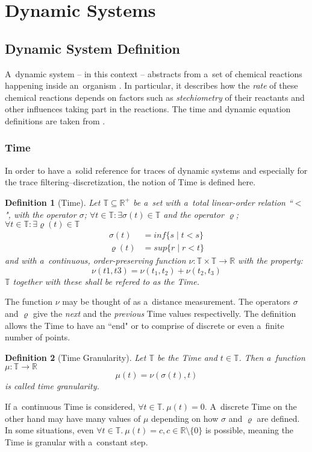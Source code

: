 \documentclass[12pt,oneside,draft]{fithesis}
\newcommand{\mReal}{\mathbb{R}}
\newcommand{\mTime}{\mathbb{T}}
\newtheorem{mydef}{Definition}
\begin{document}
\section{Dynamic Systems}
\subsection{Dynamic System Definition}
A~dynamic system -- in this context -- abstracts from
a~set of chemical reactions happening inside an~organism \cite{sven}.
In particular, it describes how the \emph{rate} of these chemical
reactions depends on factors such as \emph{stechiometry} of their
reactants and other influences taking part in the reactions.
The time and dynamic equation definitions are taken from
\cite{pospisil}.
\subsubsection{Time}
In order to have a~solid reference for traces of dynamic systems and
especially for the trace filtering--discretization, the notion of Time
is defined here.
\begin{mydef}[Time]
Let $\mTime\subseteq\mReal^{+}$ be a~set with a~total linear-order
relation ``$<$", with the operator $\sigma$;
$\forall t\in\mTime:\exists\sigma(t)\in\mTime$ and the operator
$\varrho$; $\forall t\in\mTime:\exists\varrho{}(t)\in\mTime$
	\begin{align}
		\sigma(t) &= inf\{s\mid t<s\}\\
		\varrho(t) &= sup\{r\mid r<t\}
	\end{align}
and with a~continuous, order-preserving function
	$\nu: \mTime \times \mTime \rightarrow \mReal$
with the property:
	\begin{equation}
		\nu(t1, t3) = \nu(t_1, t_2) + \nu(t_2, t_3)
	\end{equation}
$\mTime$ together with these shall be refered to as the \emph{Time}.
\end{mydef}
The function $\nu$ may be thought of as a~distance measurement.
The operators $\sigma$ and $\varrho$ give the \emph{next} and the
\emph{previous}
Time values respectivelly. The definition allows the Time
to have an ``end" or to comprise of discrete or even
a~finite number of points.

\begin{mydef}[Time Granularity]
Let $\mTime$ be the Time and $t \in \mTime$. Then a~function
$\mu: \mTime \rightarrow \mReal$
	\begin{equation}
		\mu{}(t) = \nu{}(\sigma{}(t), t)
	\end{equation} is called time granularity.
\end{mydef}
If a~continuous Time is considered,
$\forall{}t\in\mTime.\:\mu{}(t) = 0$.
A~discrete Time on the other hand may have many values of $\mu$
depending on how $\sigma$ and $\varrho$ are defined. In some situations,
even $\forall{}t\in\mTime.\:\mu{}(t) = c, c \in \mReal\setminus\{0\}$ is
possible, meaning the Time is granular with a~constant step.
\end{document}
